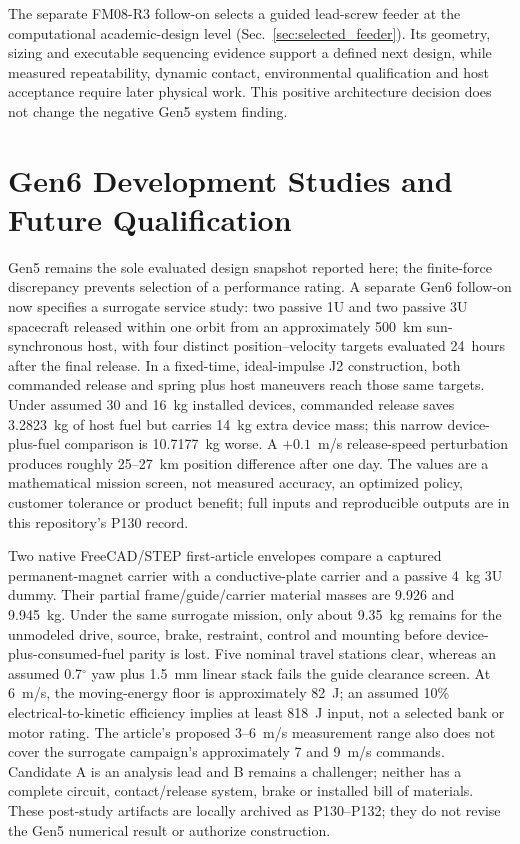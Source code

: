\documentclass[conference]{IEEEtran}
\begin{document}
The separate FM08-R3 follow-on selects a guided lead-screw feeder at the computational academic-design level (Sec.~\ref{sec:selected_feeder}). Its geometry, sizing and executable sequencing evidence support a defined next design, while measured repeatability, dynamic contact, environmental qualification and host acceptance require later physical work. This positive architecture decision does not change the negative Gen5 system finding.

\section{Gen6 Development Studies and Future Qualification}\label{sec:future}
Gen5 remains the sole evaluated design snapshot reported here; the finite-force discrepancy prevents selection of a performance rating. A separate Gen6 follow-on now specifies a surrogate service study: two passive 1U and two passive 3U spacecraft released within one orbit from an approximately 500~km sun-synchronous host, with four distinct position--velocity targets evaluated 24~hours after the final release. In a fixed-time, ideal-impulse J2 construction, both commanded release and spring plus host maneuvers reach those same targets. Under assumed 30 and 16~kg installed devices, commanded release saves 3.2823~kg of host fuel but carries 14~kg extra device mass; this narrow device-plus-fuel comparison is 10.7177~kg worse. A $+0.1$~m/s release-speed perturbation produces roughly 25--27~km position difference after one day. The values are a mathematical mission screen, not measured accuracy, an optimized policy, customer tolerance or product benefit; full inputs and reproducible outputs are in this repository's P130 record.

Two native FreeCAD/STEP first-article envelopes compare a captured permanent-magnet carrier with a conductive-plate carrier and a passive 4~kg 3U dummy. Their partial frame/guide/carrier material masses are 9.926 and 9.945~kg. Under the same surrogate mission, only about 9.35~kg remains for the unmodeled drive, source, brake, restraint, control and mounting before device-plus-consumed-fuel parity is lost. Five nominal travel stations clear, whereas an assumed 0.7$^{\circ}$ yaw plus 1.5~mm linear stack fails the guide clearance screen. At 6~m/s, the moving-energy floor is approximately 82~J; an assumed 10\% electrical-to-kinetic efficiency implies at least 818~J input, not a selected bank or motor rating. The article's proposed 3--6~m/s measurement range also does not cover the surrogate campaign's approximately 7 and 9~m/s commands. Candidate A is an analysis lead and B remains a challenger; neither has a complete circuit, contact/release system, brake or installed bill of materials. These post-study artifacts are locally archived as P130--P132; they do not revise the Gen5 numerical result or authorize construction.
\end{document}
